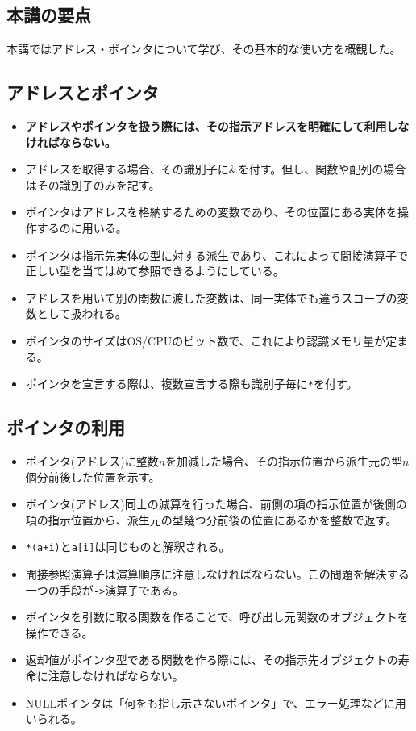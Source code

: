 \begin{shadebox}
\section*{本講の要点}
本講ではアドレス・ポインタについて学び、その基本的な使い方を概観した。
\subsection*{アドレスとポインタ}
\begin{itemize}
\item \textbf{アドレスやポインタを扱う際には、その指示アドレスを明確にして利用しなければならない。}
\item アドレスを取得する場合、その識別子に\&を付す。但し、関数や配列の場合はその識別子のみを記す。
\item ポインタはアドレスを格納するための変数であり、その位置にある実体を操作するのに用いる。
\item ポインタは指示先実体の型に対する派生であり、これによって間接演算子で正しい型を当てはめて参照できるようにしている。
\item アドレスを用いて別の関数に渡した変数は、同一実体でも違うスコープの変数として扱われる。
\item ポインタのサイズはOS/CPUのビット数で、これにより認識メモリ量が定まる。
\item ポインタを宣言する際は、複数宣言する際も識別子毎に\verb|*|を付す。
\end{itemize}

\subsection*{ポインタの利用}
\begin{itemize}
\item ポインタ(アドレス)に整数$n$を加減した場合、その指示位置から派生元の型$n$個分前後した位置を示す。
\item ポインタ(アドレス)同士の減算を行った場合、前側の項の指示位置が後側の項の指示位置から、派生元の型幾つ分前後の位置にあるかを整数で返す。
\item \verb|*(a+i)|と\verb|a[i]|は同じものと解釈される。
\item 間接参照演算子は演算順序に注意しなければならない。この問題を解決する一つの手段が\verb|->|演算子である。
\item ポインタを引数に取る関数を作ることで、呼び出し元関数のオブジェクトを操作できる。
\item 返却値がポインタ型である関数を作る際には、その指示先オブジェクトの寿命に注意しなければならない。
\item NULLポインタは「何をも指し示さないポインタ」で、エラー処理などに用いられる。
\end{itemize}
\end{shadebox}
